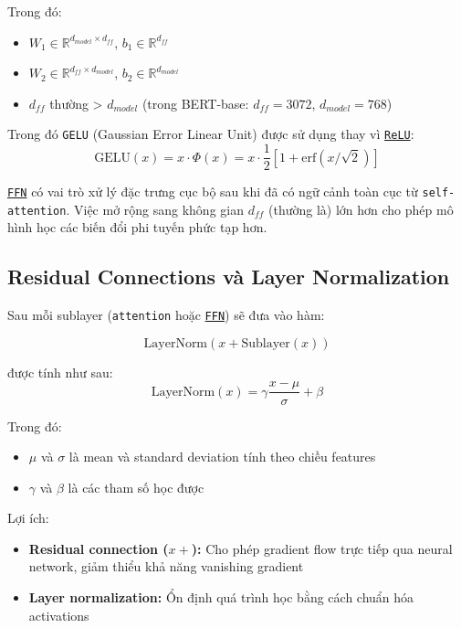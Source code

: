 Trong đó:
\begin{itemize}
    \item $W_1 \in \mathbb{R}^{d_{model} \times d_{ff}}$, $b_1 \in \mathbb{R}^{d_{ff}}$
    \item $W_2 \in \mathbb{R}^{d_{ff} \times d_{model}}$, $b_2 \in \mathbb{R}^{d_{model}}$
    \item $d_{ff}$ thường > $d_{model}$ (trong BERT-base: $d_{ff}=3072$, $d_{model}=768$)
\end{itemize}
Trong đó \texttt{GELU} (Gaussian Error Linear Unit) được sử dụng thay vì \hyperref[acro:relu]{\texttt{ReLU}}:
\begin{equation}
\text{GELU}(x) = x \cdot \Phi(x) = x \cdot \frac{1}{2}[1 + \text{erf}(x/\sqrt{2})]
\end{equation}

\hyperref[acro:ffn]{\texttt{FFN}} có vai trò xử lý đặc trưng cục bộ sau khi đã có ngữ cảnh toàn cục từ \texttt{self-attention}. Việc mở rộng sang không gian $d_{ff}$ (thường là) lớn hơn cho phép mô hình học các biến đổi phi tuyến phức tạp hơn.

\subsection{Residual Connections và Layer Normalization}
\label{ssec:residual_layer_norm}

Sau mỗi sublayer (\texttt{attention} hoặc \hyperref[acro:ffn]{\texttt{FFN}}) sẽ đưa vào hàm:

\begin{equation}
\text{LayerNorm}(x + \text{Sublayer}(x))
\label{eq:residual_layernorm}
\end{equation}

được tính như sau:
\begin{equation}
\text{LayerNorm}(x) = \gamma \frac{x - \mu}{\sigma} + \beta
\label{eq:layernorm}
\end{equation}

Trong đó:
\begin{itemize}
    \item $\mu$ và $\sigma$ là mean và standard deviation tính theo chiều features
    \item $\gamma$ và $\beta$ là các tham số học được
\end{itemize}


Lợi ích:
\begin{itemize}
    \item \textbf{Residual connection ($x +$):} Cho phép gradient flow trực tiếp qua neural network, giảm thiểu khả năng vanishing gradient
    \item \textbf{Layer normalization:} Ổn định quá trình học bằng cách chuẩn hóa activations
\end{itemize}

